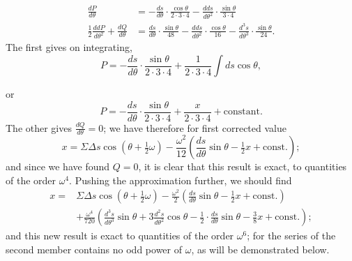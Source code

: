 \documentclass{article}
\begin{document}
\[ \begin{aligned} \frac{dP}{d\theta}&=-\frac{ds}{d\theta}\cdot\frac{\cos\theta}{2\cdot3\cdot4}-\frac{dds}{d\theta^{2}}\cdot\frac{\sin\theta}{3\cdot4}\\ \frac{1}{2}\frac{ddP}{d\theta^{2}}+\frac{dQ}{d\theta}&=\frac{ds}{d\theta}\cdot\frac{\sin\theta}{48}-\frac{dds}{d\theta^{2}}\cdot\frac{\cos\theta}{16}-\frac{d^{3}s}{d\theta^{3}}\cdot\frac{\sin\theta}{24}. \end{aligned} \]
The first gives on integrating,
\[ P=-\frac{ds}{d\theta}\cdot\frac{\sin\theta}{2\cdot3\cdot4}+\frac{1}{2\cdot3\cdot4}\int ds\cos\theta, \]

or
\[ P=-\frac{ds}{d\theta}\cdot\frac{\sin\theta}{2\cdot3\cdot4}+\frac{x}{2\cdot3\cdot4}+\text{constant}. \]
The other gives $\frac{dQ}{d\theta}=0$; we have therefore for first corrected value
\[ x=\Sigma\Delta s\cos(\theta+\tfrac{1}{2}\omega)-\frac{\omega^{2}}{12}\left(\frac{ds}{d\theta}\sin\theta-\tfrac{1}{2}x+\text{const.}\right); \]
and since we have found $Q=0$, it is clear that this result is exact, to quantities of the order $\omega^{4}$. Pushing the approximation further, we should find
\[ \begin{aligned} x={}&\Sigma\Delta s\cos(\theta+\tfrac{1}{2}\omega)-\frac{\omega^{2}}{2}\left(\frac{ds}{d\theta}\sin\theta-\tfrac{1}{2}x+\text{const.}\right)\\ &+\frac{\omega^{4}}{720}\left(\frac{d^{3}s}{d\theta^{3}}\sin\theta+3\frac{d^{2}s}{d\theta^{2}}\cos\theta-\frac{1}{2}\cdot\frac{ds}{d\theta}\sin\theta-\frac{3}{8}x+\text{const.}\right); \end{aligned} \]
and this new result is exact to quantities of the order $\omega^{6}$; for the series of the second member contains no odd power of $\omega$, as will be demonstrated below.
\end{document}
